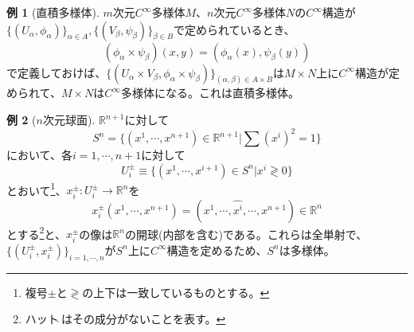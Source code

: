 \documentclass[unicode,a4paper,11pt]{ltjsarticle}
\theoremstyle{definition}
\newtheorem{exm}{例}[section]
\begin{document}
\begin{exm}[直積多様体]
  $m$次元$C^{\infty}$多様体$M$、$n$次元$C^{\infty}$多様体$N$の$C^{\infty}$構造が$\{(U_{\alpha},\phi_{\alpha})\}_{\alpha\in A},\{(V_{\beta},\psi_{\beta})\}_{\beta\in B}$で定められているとき、
  \begin{equation}
    (\phi_{\alpha}\times\psi_{\beta})(x,y)
    =
    (\phi_{\alpha}(x),\psi_{\beta}(y))
  \end{equation}
  で定義しておけば、$\{(U_{\alpha}\times V_{\beta},\phi_{\alpha}\times\psi_{\beta})\}_{(\alpha,\beta)\in A\times B}$は$M\times N$上に$C^{\infty}$構造が定められて、$M\times N$は$C^{\infty}$多様体になる。これは直積多様体。
\end{exm}

\begin{exm}[$n$次元球面]
  $\mathbb{R}^{n+1}$に対して
  \begin{equation}
    S^{n}
    =
    \{
    (x^{1},\cdots,x^{n+1})\in\mathbb{R}^{n+1}
    |
    \sum (x^{i})^2=1
    \}
  \end{equation}
  において、各$i=1,\cdots,n+1$に対して
  \begin{equation}
    U_{i}^{\pm}
    \equiv
    \{
    (x^{1},\cdots,x^{i+1})\in S^{n}
    |
    x^{i}\gtrless 0
    \}
  \end{equation}
  とおいて\footnote{
    複号$\pm$と$\gtrless$の上下は一致しているものとする。
  }、$x_{i}^{\pm}:U_{i}^{\pm}\rightarrow\mathbb{R}^{n}$を
  \begin{equation}
    x_{i}^{\pm}(x^{1},\cdots,x^{n+1})
    =
    (x^{1},\cdots,\widehat{x^{i}},\cdots,x^{n+1})
    \in \mathbb{R}^{n}
  \end{equation}
  とする\footnote{
    ハット$\widehat{\ }$はその成分がないことを表す。
  }と、$x^{\pm}_{i}$の像は$\mathbb{R}^{n}$の開球(内部を含む)である。これらは全単射で、$\{(U_{i}^{\pm},x_{i}^{\pm})\}_{i=1,\cdots,n}$が$S^{n}$上に$C^{\infty}$構造を定めるため、$S^{n}$は多様体。
\end{exm}
\end{document}

